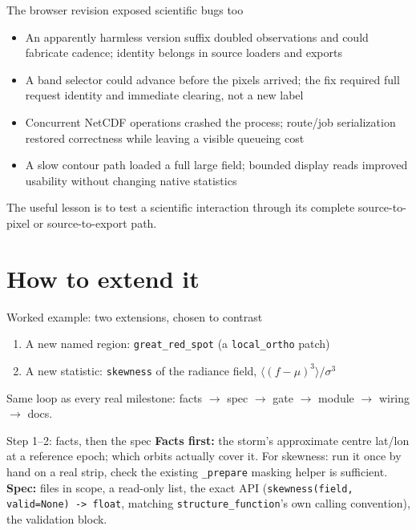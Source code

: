 \documentclass[aspectratio=169,11pt]{beamer}
\newcommand{\currevsec}{}
\newcommand{\revsec}[1]{\gdef\currevsec{#1}}
\begin{document}
\begin{frame}{The browser revision exposed scientific bugs too}
  \revsec{6}
\begin{itemize}
    \item An apparently harmless version suffix doubled observations and could fabricate cadence; identity belongs in source loaders and exports
    \item A band selector could advance before the pixels arrived; the fix required full request identity and immediate clearing, not a new label
    \item Concurrent NetCDF operations crashed the process; route/job serialization restored correctness while leaving a visible queueing cost
    \item A slow contour path loaded a full large field; bounded display reads improved usability without changing native statistics
  \end{itemize}
  The useful lesson is to test a scientific interaction through its complete source-to-pixel or source-to-export path.
\end{frame}

\section{How to extend it}

\begin{frame}{Worked example: two extensions, chosen to contrast}
  \revsec{7}
  \begin{enumerate}
    \item A new named region: \texttt{great\_red\_spot} (a \texttt{local\_ortho} patch)
    \item A new statistic: \texttt{skewness} of the radiance field, $\langle(f-\mu)^3\rangle/\sigma^3$
  \end{enumerate}
  \vspace{0.2cm}
  Same loop as every real milestone: facts $\to$ spec $\to$ gate $\to$ module $\to$ wiring $\to$ docs.
\end{frame}

\begin{frame}{Step 1--2: facts, then the spec}
  \revsec{7}
  \textbf{Facts first:} the storm's approximate centre lat/lon at a reference epoch; which orbits actually cover it. For skewness: run it once by hand on a real strip, check the existing \texttt{\_prepare} masking helper is sufficient.
  \vspace{0.2cm}
  \textbf{Spec:} files in scope, a read-only list, the exact API (\texttt{skewness(field, valid=None) -> float}, matching \texttt{structure\_function}'s own calling convention), the validation block.
\end{frame}
\end{document}
